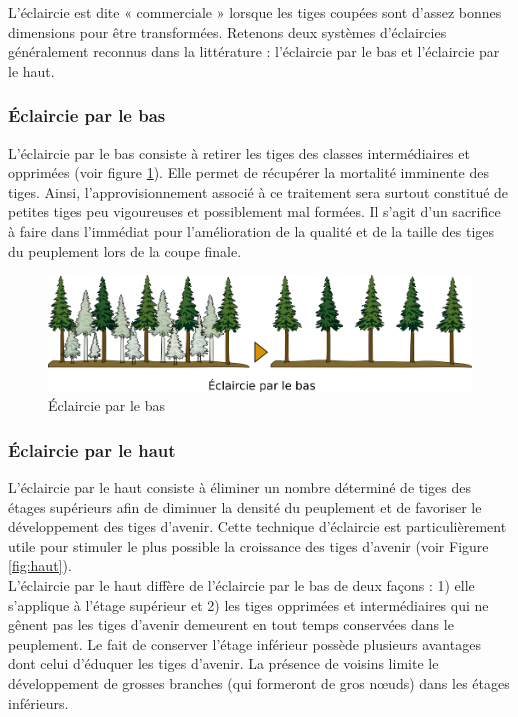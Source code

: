 L'éclaircie est dite « commerciale » lorsque les tiges coupées sont d'assez bonnes dimensions pour être transformées. Retenons deux systèmes d'éclaircies généralement reconnus dans la littérature : l'éclaircie par le bas et l'éclaircie par le haut.\\

\subsubsection{Éclaircie par le bas}

L'éclaircie par le bas consiste à retirer les tiges des classes intermédiaires et opprimées (voir figure \ref{fig:bas}). Elle permet de récupérer la mortalité imminente des tiges. Ainsi, l'approvisionnement associé à ce traitement sera surtout constitué de petites tiges peu vigoureuses et possiblement mal formées. Il s'agit d'un sacrifice à faire dans l'immédiat pour l'amélioration de la qualité et de la taille des tiges du peuplement lors de la coupe finale.\\ 

\begin{figure}[!h]
	\centering
	\includegraphics[width=1\linewidth]{./img/ch8_bas}
	\caption{Éclaircie par le bas}
	\label{fig:bas}
\end{figure}

\subsubsection{Éclaircie par le haut}

L'éclaircie par le haut consiste à éliminer un nombre déterminé de tiges des étages supérieurs afin de diminuer la densité du peuplement et de favoriser le développement des tiges d'avenir. Cette technique d'éclaircie est particulièrement utile pour stimuler le plus possible la croissance des tiges d'avenir \citep{smith1997practice} (voir Figure \ref{fig:haut}).\\

L'éclaircie par le haut diffère de l'éclaircie par le bas de deux façons : 1) elle s'applique à l'étage supérieur et 2) les tiges opprimées et intermédiaires qui ne gênent pas les tiges d'avenir demeurent en tout temps conservées dans le peuplement. Le fait de conserver l'étage inférieur possède plusieurs avantages dont celui d'éduquer les tiges d'avenir. La présence de voisins limite le développement de grosses branches (qui formeront de gros nœuds) dans les étages inférieurs.

